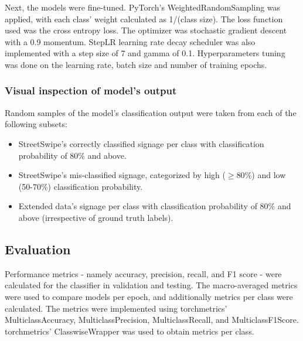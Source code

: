 Next, the models were fine-tuned. PyTorch's WeightedRandomSampling was applied, with each class' weight calculated as 1/(class size). The loss function used was the cross entropy loss. The optimizer was stochastic gradient descent with a 0.9 momentum. StepLR learning rate decay scheduler was also implemented with a step size of 7 and gamma of 0.1. Hyperparameters tuning was done on the learning rate, batch size and number of training epochs.

\subsubsection{Visual inspection of model's output}
Random samples of the model's classification output were taken from each of the following subsets:

\begin{itemize}
    \item StreetSwipe's correctly classified signage per class with classification probability of 80\% and above.
    \item StreetSwipe's mis-classified signage, categorized by high ($ \geq 80\% $) and low (50-70\%) classification probability.
    \item Extended data's signage per class with classification probability of 80\% and above (irrespective of ground truth labels).
\end{itemize}


\subsection{Evaluation}

Performance metrics - namely accuracy, precision, recall, and F1 score - were calculated for the classifier in validation and testing. The macro-averaged metrics were used to compare models per epoch, and additionally metrics per class were calculated. The metrics were implemented using torchmetrics' MulticlassAccuracy, MulticlassPrecision, MulticlassRecall, and MulticlassF1Score. torchmetrics' ClasswiseWrapper was used to obtain metrics per class.



